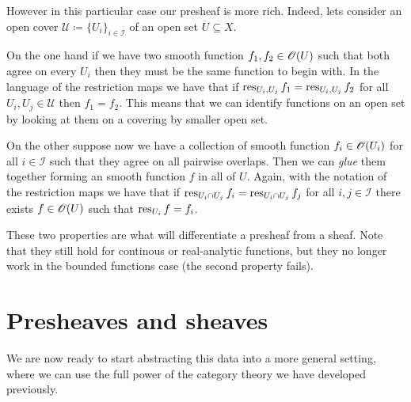 \documentclass[../../main]{subfiles}
\begin{document}
However in this particular case our presheaf is more rich.
Indeed, lets consider an open cover \(\mathcal{U} \coloneq \{U_{i}\}_{i \in \mathcal{I}}\) of an open set \(U \subseteq X\).

On the one hand if we have two smooth function \(f_{1}, f_{2} \in \mathscr{O}(U)\) such that both agree on every \(U_{i}\) then they must be the same function to begin with.
In the language of the restriction maps we have that if \(\operatorname{res}_{U_{i}, U_{j}} f_{1} = \operatorname{res}_{U_{i}, U_{j}} f_{2}\) for all \(U_{i}, U_{j} \in \mathcal{U}\) then \(f_{1} = f_{2}\).
This means that we can identify functions on an open set by looking at them on a covering by smaller open set.

On the other suppose now we have a collection of smooth function \(f_{i} \in \mathscr{O}(U_{i})\) for all \(i \in \mathcal{I}\) such that they agree on all pairwise overlaps.
Then we can \textit{glue} them together forming an smooth function \(f\) in all of \(U\).
Again, with the notation of the restriction maps we have that if \(\operatorname{res}_{U_{i} \cap U_{j}} f_{i} = \operatorname{res}_{U_{i} \cap U_{j}} f_{j}\) for all \(i, j \in \mathcal{I}\) there exists \(f \in \mathscr{O}(U)\) such that \(\operatorname{res}_{U_{i}} f = f_{i}\).

These two properties are what will differentiate a presheaf from a sheaf.
Note that they still hold for continous or real-analytic functions, but they no longer work in the bounded functions case (the second property fails).

\section{Presheaves and sheaves}

We are now ready to start abstracting this data into a more general setting, where we can use the full power of the category theory we have developed previously.
\end{document}
